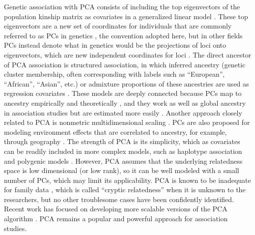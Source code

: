 \documentclass[11pt]{article}
\begin{document}
\begin{linenumbers}
Genetic association with PCA consists of including the top eigenvectors of the population kinship matrix as covariates in a generalized linear model \citep{zhang_semiparametric_2003, price_principal_2006, bouaziz_accounting_2011}.
These top eigenvectors are a new set of coordinates for individuals that are commonly referred to as PCs in genetics \citep{patterson_population_2006}, the convention adopted here, but in other fields PCs instead denote what in genetics would be the projections of loci onto eigenvectors, which are new independent coordinates for loci \citep{jolliffe_principal_2002}.
The direct ancestor of PCA association is structured association, in which inferred ancestry (genetic cluster membership, often corresponding with labels such as ``European'', ``African'', ``Asian'', etc.) or admixture proportions of these ancestries are used as regression covariates \citep{pritchard_association_2000}.
These models are deeply connected because PCs map to ancestry empirically \citep{alexander_fast_2009, zhou_strong_2016} and theoretically \citep{mcvean_genealogical_2009,zheng_eigenanalysis_2016,cabreros_likelihood-free_2019,chiu_inferring_2022}, and they work as well as global ancestry in association studies but are estimated more easily \citep{patterson_population_2006, zhao_arabidopsis_2007, alexander_fast_2009, bouaziz_accounting_2011}.
Another approach closely related to PCA is nonmetric multidimensional scaling \citep{zhu_nonmetric_2009}.
PCs are also proposed for modeling environment effects that are correlated to ancestry, for example, through geography \citep{novembre_genes_2008, zhang_principal_2015, lin_admixed_2021}.
The strength of PCA is its simplicity, which as covariates can be readily included in more complex models, such as haplotype association \citep{xu_detecting_2014} and polygenic models \citep{qian_fast_2020}.
However, PCA assumes that the underlying relatedness space is low dimensional (or low rank), so it can be well modeled with a small number of PCs, which may limit its applicability.
PCA is known to be inadequate for family data \citep{patterson_population_2006, zhu_nonmetric_2009, thornton_roadtrips:_2010, price_new_2010}, which is called ``cryptic relatedness'' when it is unknown to the researchers, but no other troublesome cases have been confidently identified.
Recent work has focused on developing more scalable versions of the PCA algorithm \citep{lee_sparse_2012, abraham_fast_2014, galinsky_fast_2016, abraham_flashpca2:_2017, agrawal_scalable_2020}.
PCA remains a popular and powerful approach for association studies.


\end{linenumbers}
\end{document}
